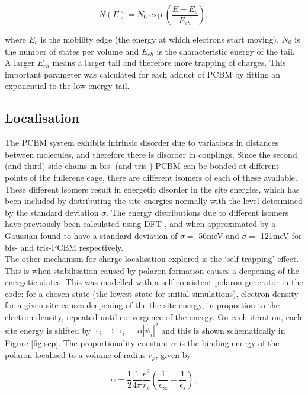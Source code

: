 \documentclass[a4paper,12pt]{article}
\begin{document}
\begin{equation}
N(E)=N_0\exp \left (\frac{E-E_c}{E_{ch}} \right),
\end{equation}

 \noindent where $E_c$ is the mobility edge (the energy at which electrons start moving), $N_0$ is the number of states per volume and $E_{ch}$ is the characteristic energy of the tail. A larger $E_{ch}$ means a larger tail and therefore more trapping of charges. This important parameter was calculated for each adduct of PCBM by fitting an exponential to the low energy tail.
 
 
\subsection{Localisation}

\noindent The PCBM system exhibits intrinsic disorder due to variations in distances between molecules, and therefore there is disorder in couplings. Since the second (and third) side-chains in bis- (and tris-) PCBM can be bonded at different points of the fullerene cage, there are different isomers of each of these available. These different isomers result in energetic disorder in the site energies, which has been included by distributing the site energies normally with the level determined by the standard deviation $\sigma$. The energy distributions due to different isomers have previously been calculated using DFT \cite{Frost2010a}, and when approximated by a Gaussian found to have a standard deviation of $\sigma=$ 56meV and $\sigma=$ 121meV for bis- and tris-PCBM respectively. \\

\noindent  The other mechanism for charge localisation explored is the `self-trapping' effect. This is when stabilisation caused by polaron formation causes a deepening of the energetic states. This was modelled with a self-consistent polaron generator in the code: for a chosen state (the lowest state for initial simulations), electron density for a given site causes deepening of the the site energy, in proportion to the electron density, repeated until convergence of the energy. On each iteration, each site energy is shifted by $\upvarepsilon_i \rightarrow \upvarepsilon_i-\alpha |\psi_i|^2$ and this is shown schematically in Figure \ref{fig:scp}. The proportionality constant $\alpha$ is the binding energy of the polaron localised to a volume of radius $r_p$, given by \cite{tssp} 

\begin{equation}
\alpha=\frac{1}{2}\frac{1}{4\pi}\frac{e^2}{r_p} \left ( \frac{1}{\upvarepsilon_\infty}-\frac{1}{\upvarepsilon_s} \right ), 
\label{eq:alpha}
\end{equation}\\
\end{document}
